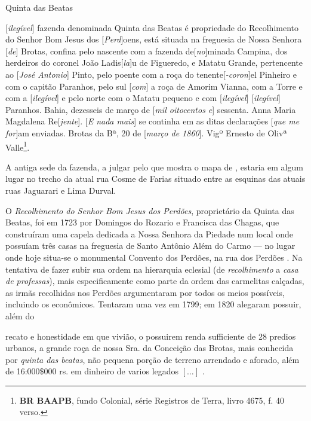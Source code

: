 \begin{citacao}
Quinta das Beatas

[\textit{ilegível}] fazenda denominada Quinta das Beatas é propriedade do Recolhimento do Senhor Bom Jesus dos [\textit{Perd}]oens, está situada na freguesia de Nossa Senhora [\textit{de}] Brotas, confina pelo nascente com a fazenda de[\textit{no}]minada Campina, dos herdeiros do coronel João Ladis[\textit{la}]u de Figueredo, e Matatu Grande, pertencente ao [\textit{José Antonio}] Pinto, pelo poente com a roça do tenente[\textit{-coron}]el Pinheiro e com o capitão Paranhos, pelo sul [\textit{com}] a roça de Amorim Vianna, com a Torre e com a [\textit{ilegível}] e pelo norte com o Matatu pequeno e com [\textit{ilegível}] [\textit{ilegível}] Paranhos. Bahia, dezesseis de março de [\textit{mil oitocentos e}] sessenta. Anna Maria Magdalena Re[\textit{jente}]. [\textit{E nada mais}] se continha em as ditas declarações [\textit{que me for}]am enviadas. Brotas da Bª, 20 de [\textit{março de 1860}]. Vigº Ernesto de Olivª Valle\footnote{\textbf{BR BAAPB}, fundo Colonial, série Registros de Terra, livro 4675, f. 40 verso.}.
\end{citacao}

A antiga sede da fazenda, a julgar pelo que mostra o mapa de , estaria em algum lugar no trecho da atual rua Cosme de Farias situado entre as esquinas das atuais ruas Jaguarari e Lima Durval.

O \textit{Recolhimento do Senhor Bom Jesus dos Perdões}, proprietário da Quinta das Beatas, foi em 1723 por Domingos do Rozario e Francisca das Chagas, que construíram uma capela dedicada a Nossa Senhora da Piedade num local onde possuíam três casas na freguesia de Santo Antônio Além do Carmo --- no lugar onde hoje situa-se o monumental Convento dos Perdões, na rua dos Perdões \cite[p.~43]{ramalho_sagrado_2014}. Na tentativa de fazer subir sua ordem na hierarquia eclesial (de \textit{recolhimento} a \textit{casa de professas}), mais especificamente como parte da ordem das carmelitas calçadas, as irmãs recolhidas nos Perdões argumentaram por todos os meios possíveis, incluindo os econômicos. Tentaram uma vez em 1799; em 1820 alegaram possuir, além do 

\begin{citacao}
recato e honestidade em que vivião, o possuirem renda sufficiente de 28 predios urbanos, a grande roça de nossa Sra. da Conceição das Brotas, mais conhecida por \textit{quinta das beatas}, não pequena porção de terreno arrendado e aforado, além de 16:000\$000 rs. em dinheiro de varios legados \([\dots]\) \cite[p.~231]{accioli_memorias5_1937}.
\end{citacao}

